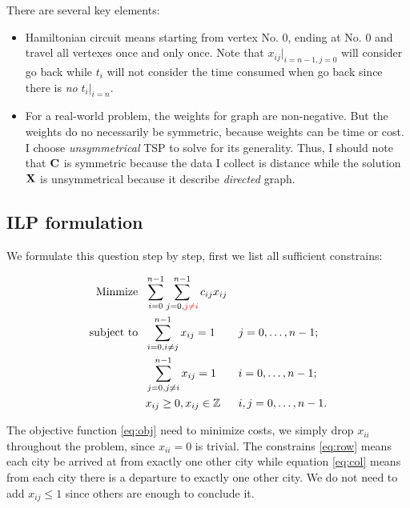 \documentclass{mcmthesis}
\begin{document}
There are several key elements:
\begin{itemize}
	\item Hamiltonian circuit means starting from vertex No. 0, ending at No. 0 and travel all vertexes once and only once. Note that $x_{ij}|_{i=n-1,j=0}$ will consider go back while  $t_i$ will not consider the time consumed when go back since there is \textit{no} $t_i|_{i=n}$.
	\item For a real-world problem, the weights for graph are non-negative. But the weights do no necessarily be symmetric, because weights can be time or cost. I choose \textit{unsymmetrical}  TSP to solve for its generality. Thus, I should note that $\mathbf{C}$ is symmetric because the data I collect is distance while the solution $\mathbf{X}$ is unsymmetrical because it describe \textit{directed} graph.
\end{itemize} 

\subsection{ILP formulation}
We formulate this question step by step, first we list all sufficient constrains:

\begin{align}
\mathop{\mathrm{Minmize \ \  }}       & \sum _{i=0}^{n-1}\sum _{j=0,{\color{Red} j\neq i}}^{n-1}c_{ij}x_{ij} &  & \label{eq:obj}          \\
\mathop{\mathrm{subject \  to \ \  }} & \sum _{i=0,i\neq j}^{n-1}x_{ij}=1                          &  & j=0,\ldots ,n-1;   \label{eq:row}       \\
& \sum _{j=0,j\neq i}^{n-1}x_{ij}=1                          &  & i=0,\ldots ,n-1;         \label{eq:col} \\
& x_{ij} \geq 0, x_{ij} \in \Zbb                                           &  & i,j=0,\ldots ,n-1. \notag
\end{align}

The objective function \eqref{eq:obj} need to minimize costs, we simply drop $x_{ii}$ throughout the problem, since $x_{ii}=0$ is trivial. The constrains \eqref{eq:row} means each city be arrived at from exactly one other city while equation \eqref{eq:col} means from each city there is a departure to exactly one other city. We do not need to add $x_{ij} \le 1 $ since others are enough to conclude it. 
\end{document}
